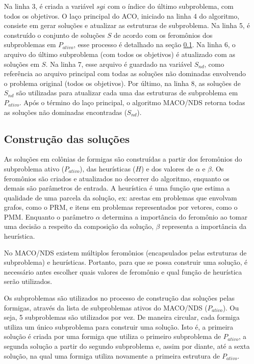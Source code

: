 Na linha 3, é criada a variável $sgi$ com o índice do último subproblema, com todos os objetivos. O laço principal do ACO, iniciado na linha 4 do algoritmo, consiste em gerar soluções e atualizar as estruturas de subproblema. Na linha 5, é construído o conjunto de soluções $S$ de acordo com os feromônios dos subproblemas em $P_{ativo}$, esse processo é detalhado na seção \ref{section_macod_solutions}. Na linha 6, o arquivo do último subproblema (com todos os objetivos) é atualizado com as soluções em $S$. Na linha 7, esse arquivo é guardado na variável $S_{nd}$, como referência ao arquivo principal com todas as soluções não dominadas envolvendo o problema original (todos os objetivos). Por último, na linha 8, as soluções de $S_{nd}$ são utilizadas para atualizar cada uma das estruturas de subproblema em $P_{ativo}$. Após o término do laço principal, o algoritmo MACO/NDS retorna todas as soluções não dominadas encontradas ($S_{nd}$).

\subsection{Construção das soluções}
\label{section_macod_solutions}

As soluções em colônias de formigas são construídas a partir dos feromônios do subproblema ativo ($P_{ativo}$), das heurísticas ($H$) e dos valores de $\alpha$ e $\beta$. Os feromônios são criados e atualizados no decorrer do algoritmo, enquanto os demais são parâmetros de entrada. A heurística é uma função que estima a qualidade de uma parcela da solução, ex: arestas em problemas que envolvam grafos, como o PRM, e itens em problemas representados por vetores, como o PMM. Enquanto o parâmetro $\alpha$ determina a importância do feromônio ao tomar uma decisão a respeito da composição da solução, $\beta$ representa a importância da heurística.

No MACO/NDS existem múltiplos feromônios (encapsulados pelas estruturas de subproblema) e heurísticas. Portanto, para que se possa construir uma solução, é necessário antes escolher quais valores de feromônio e qual função de heurística serão utilizados. 

Os subproblemas são utilizados no processo de construção das soluções pelas formigas, através da lista de subproblemas ativos do MACO/NDS ($P_{ativo}$). Ou seja, 5 subproblemas são utilizados por vez. De maneira circular, cada formiga utiliza um único subproblema para construir uma solução. Isto é, a primeira solução é criada por uma formiga que utiliza o primeiro subproblema de $P_{ativo}$, a segunda solução a partir do segundo subproblema e, assim por diante, até a sexta solução, na qual uma formiga utiliza novamente a primeira estrutura de $P_{ativo}$.

